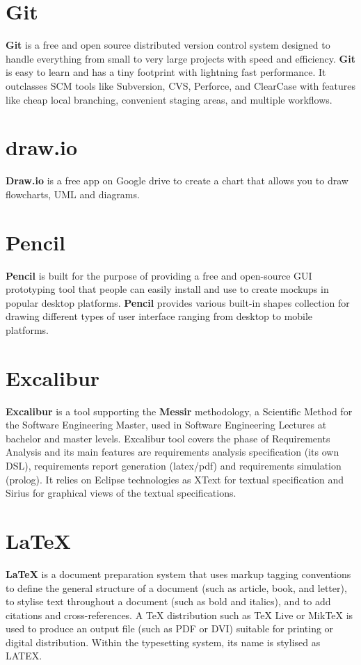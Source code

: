\section{Git}
\label{sec:Git}
\textbf{Git} is a free and open source distributed version control system designed to handle 
everything from small to very large projects with speed and efficiency.
\textbf{Git} is easy to learn and has a tiny footprint with lightning fast
performance. It outclasses SCM tools like Subversion, CVS, Perforce, and ClearCase 
with features like cheap local branching, convenient staging areas, and multiple workflows.

\section{draw.io}
\label{sec:drawio}
\textbf{Draw.io} is a free app on Google drive to create a chart that allows you
to draw flowcharts, UML and diagrams.

\section{Pencil}
\label{sec:pencil}
\textbf{Pencil} is built for the purpose of providing a free and
open-source GUI prototyping tool that people can easily install and use to
create mockups in popular desktop platforms. \textbf{Pencil} provides various
built-in shapes collection for drawing different types of user interface ranging
from desktop to mobile platforms.

\section{Excalibur}
\label{sec:excalibur}
\textbf{Excalibur} is a tool supporting the \textbf{Messir} methodology, a
Scientific Method for the Software Engineering Master, used in Software
Engineering Lectures at bachelor and master levels. Excalibur tool covers the
phase of Requirements Analysis and its main features are requirements analysis
specification (its own DSL), requirements report generation (latex/pdf) and
requirements simulation (prolog). It relies on Eclipse technologies as XText for
textual specification and Sirius for graphical views of the textual
specifications.

\section{LaTeX}
\label{sec:latex}
\textbf{LaTeX} is a document preparation system that uses markup tagging
conventions to define the general structure of a document (such as article,
book, and letter), to stylise text throughout a document (such as bold and
italics), and to add citations and cross-references. A TeX distribution such as
TeX Live or MikTeX is used to produce an output file (such as PDF or DVI)
suitable for printing or digital distribution. Within the typesetting system,
its name is stylised as LATEX.
